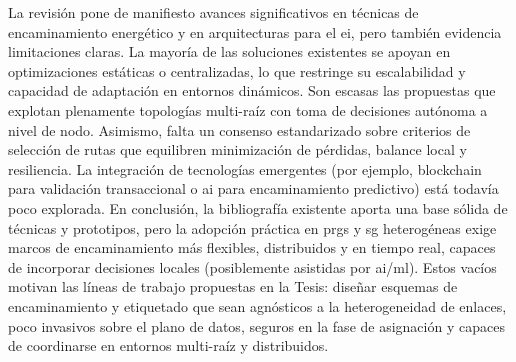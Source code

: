 La revisión pone de manifiesto avances significativos en técnicas de encaminamiento energético y en arquitecturas para el \gls{ei}, pero también evidencia limitaciones claras. La mayoría de las soluciones existentes se apoyan en optimizaciones estáticas o centralizadas, lo que restringe su escalabilidad y capacidad de adaptación en entornos dinámicos. Son escasas las propuestas que explotan plenamente topologías multi-raíz con toma de decisiones autónoma a nivel de nodo. Asimismo, falta un consenso estandarizado sobre criterios de selección de rutas que equilibren minimización de pérdidas, balance local y resiliencia. La integración de tecnologías emergentes (por ejemplo, blockchain para validación transaccional o \gls{ai} para encaminamiento predictivo) está todavía poco explorada. En conclusión, la bibliografía existente aporta una base sólida de técnicas y prototipos, pero la adopción práctica en \glspl{prg} y \gls{sg} heterogéneas exige marcos de encaminamiento más flexibles, distribuidos y en tiempo real, capaces de incorporar decisiones locales (posiblemente asistidas por \gls{ai}/\gls{ml}). Estos vacíos motivan las líneas de trabajo propuestas en la Tesis: diseñar esquemas de encaminamiento y etiquetado que sean agnósticos a la heterogeneidad de enlaces, poco invasivos sobre el plano de datos, seguros en la fase de asignación y capaces de coordinarse en entornos multi-raíz y distribuidos.

